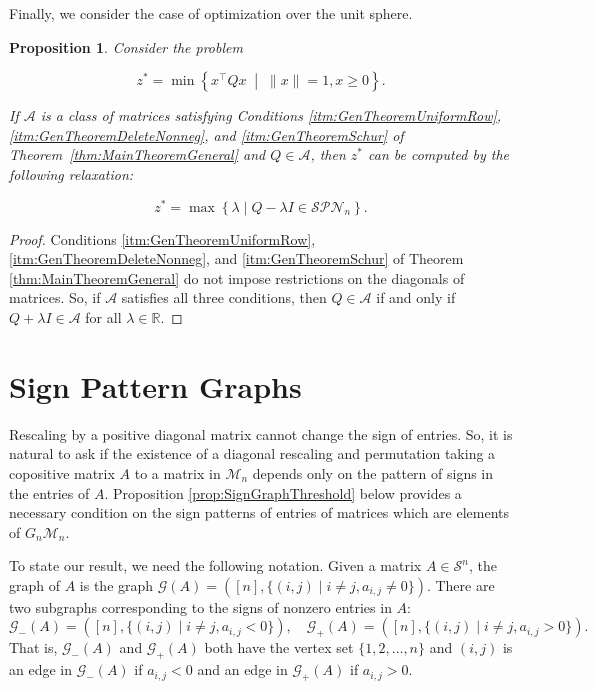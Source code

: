 \documentclass{amsart}
\newcommand{\bbR}{\mathbb{R}}
\newcommand{\cA}{\mathcal{A}}
\newcommand{\cM}{\mathcal{M}}
\newcommand{\cS}{\mathcal{S}}
\newcommand{\cG}{\mathcal{G}}
\newcommand{\SPN}{\mathcal{SPN}}
\newtheorem{proposition}[theorem]{Proposition}
\theoremstyle{definition}
\begin{document}
Finally, we consider the case of optimization over the unit sphere. 

\begin{proposition}
Consider the problem 

\[z^* = \min \left\{ x^\top Q x \;\middle\vert\; 
\|x\| =1, x\geq 0 \right\}.\]

If $\cA$ is a class of matrices satisfying Conditions \ref{itm:GenTheoremUniformRow},  \ref{itm:GenTheoremDeleteNonneg}, and \ref{itm:GenTheoremSchur} of Theorem~\ref{thm:MainTheoremGeneral} and $Q \in \cA$, then $z^*$ can be computed by the following relaxation:

\[z^* = \max \left\{ \lambda \;\vert\; Q-\lambda I \in \SPN_n \right\}.\]
\end{proposition}
\begin{proof}
Conditions \ref{itm:GenTheoremUniformRow},  \ref{itm:GenTheoremDeleteNonneg}, and \ref{itm:GenTheoremSchur} of Theorem \ref{thm:MainTheoremGeneral} do not impose restrictions on the diagonals of matrices. So, if $\cA$ satisfies all three conditions, then $Q \in \cA$ if and only if $Q+\lambda I \in \cA$ for all $\lambda \in \bbR$.
\end{proof}

\section{Sign Pattern Graphs}\label{sec:SignGraphs}

Rescaling by a positive diagonal matrix cannot change the sign of entries. So, it is natural to ask if the existence of a diagonal rescaling and permutation taking a copositive matrix $A$ to a matrix in $\mathcal{M}_n$ depends only on the pattern of signs in the entries of $A$. Proposition \ref{prop:SignGraphThreshold} below provides a necessary condition on the sign patterns of entries of matrices which are elements of $G_n\cM_n$.

To state our result, we need the following notation. Given a matrix $A \in \cS^n$, the graph of $A$ is the graph $\cG(A) = ([n],\{(i,j)\; \vert \; i\neq j, a_{i,j} \neq 0\})$. There are two subgraphs corresponding to the signs of nonzero entries in $A$:
\[\cG_{-}(A) = ([n],\{(i,j) \; \vert \; i\neq j, a_{i,j} < 0\}), \quad \cG_{+}(A) = ([n],\{(i,j) \; \vert \; i\neq j, a_{i,j} > 0\}).\]
%
That is, $\cG_{-}(A)$ and $\cG_{+}(A)$ both have the vertex set $\{1,2,\ldots, n\}$ and $(i,j)$ is an edge in $\cG_{-}(A)$ if $a_{i,j}<0$ and an edge in $\cG_{+}(A)$ if $a_{i,j} > 0$. 
\end{document}

